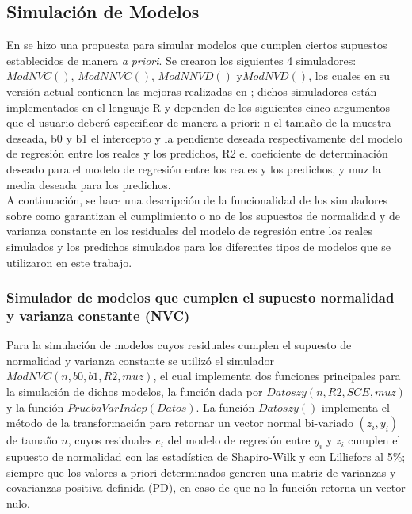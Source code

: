 \subsection{Simulación de Modelos}

En \textcite{febles-2014} se hizo una propuesta para simular modelos que cumplen ciertos supuestos establecidos de manera \textit{a priori}. Se crearon los siguientes 4 simuladores: $ModNVC()$, $ModNNVC()$, $ModNNVD()$ y$ ModNVD()$, los cuales en su versión actual contienen las mejoras realizadas en \textcite{zacarias-2023}; dichos simuladores están implementados en el lenguaje R y dependen de los siguientes cinco argumentos que el usuario deberá especificar de manera a priori: n el tamaño de la muestra deseada, b0 y b1 el intercepto y la pendiente deseada respectivamente del modelo de regresión entre los reales y los predichos, R2 el coeficiente de determinación deseado para el modelo de regresión entre los reales y los predichos, y muz la media deseada para los predichos. \\

A continuación, se hace una descripción de la funcionalidad de los simuladores sobre como garantizan el cumplimiento o no de los supuestos de normalidad y de varianza constante en los residuales del modelo de regresión entre los reales simulados y los predichos simulados para los diferentes tipos de modelos que se utilizaron en este trabajo.\\





\subsubsection{Simulador de modelos que cumplen el supuesto normalidad y varianza constante (NVC)}

Para la simulación de modelos cuyos residuales cumplen el supuesto de normalidad y varianza constante se utilizó el simulador $ModNVC(n,b0,b1,R2,muz)$, el cual implementa dos funciones principales para la simulación de dichos modelos, la función dada por \newline $Datoszy(n, R2, SCE, muz)$ y la función $PruebaVarIndep(Datos)$. La función $Datoszy()$ implementa el método de la transformación para retornar un vector normal bi-variado $(z_i,y_i)$ de tamaño $n$, cuyos residuales $e_i$ del  modelo de regresión  entre $y_i$ y $z_i$ cumplen el supuesto de normalidad con las estadística de Shapiro-Wilk y con Lilliefors al 5\%; siempre que los valores a priori determinados generen una matriz de varianzas y covarianzas positiva definida (PD), en caso de que no la función retorna un vector nulo.\\



